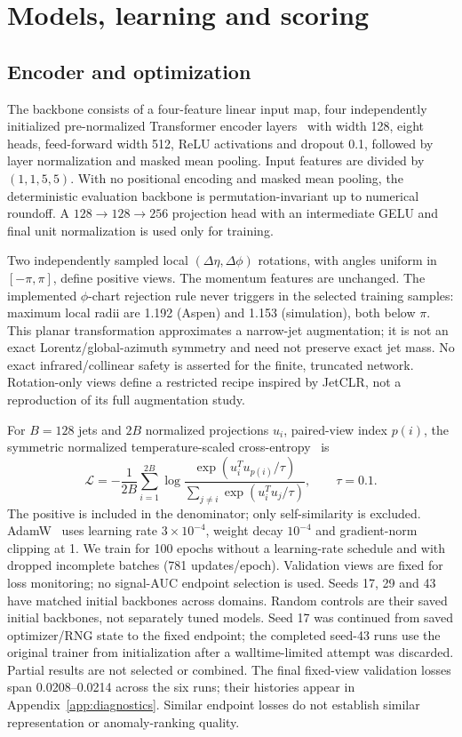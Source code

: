 \documentclass[11pt,a4paper]{article}
\begin{document}
\section{Models, learning and scoring}
\subsection{Encoder and optimization}
The backbone consists of a four-feature linear input map, four independently
initialized pre-normalized Transformer encoder layers~\cite{attention} with width
128, eight heads, feed-forward width 512, ReLU activations and dropout 0.1, followed
by layer normalization and masked mean pooling. Input features are divided by
$(1,1,5,5)$. With no positional encoding and masked mean pooling, the deterministic
evaluation backbone is permutation-invariant up to numerical roundoff.
A $128\to128\to256$ projection head
with an intermediate GELU and final unit normalization is used only for training.

Two independently sampled local $(\Delta\eta,\Delta\phi)$ rotations, with angles
uniform in $[-\pi,\pi]$, define positive views. The momentum features are unchanged.
The implemented $\phi$-chart rejection rule never triggers in the selected training
samples: maximum local radii are 1.192 (Aspen) and 1.153 (simulation), both below
$\pi$. This planar transformation approximates a narrow-jet augmentation; it is
not an exact Lorentz/global-azimuth symmetry and need not preserve exact jet mass.
No exact infrared/collinear safety is asserted for the finite, truncated network.
Rotation-only views define a restricted recipe inspired by JetCLR, not a
reproduction of its full augmentation study.

For $B=128$ jets and $2B$ normalized projections $u_i$, paired-view index $p(i)$,
the symmetric normalized temperature-scaled cross-entropy~\cite{simclr} is
\begin{equation}
 \mathcal L=-\frac{1}{2B}\sum_{i=1}^{2B}
 \log\frac{\exp(u_i^Tu_{p(i)}/\tau)}{\sum_{j\ne i}\exp(u_i^Tu_j/\tau)},\qquad\tau=0.1.
\end{equation}
The positive is included in the denominator; only self-similarity is excluded.
AdamW~\cite{adamw} uses learning rate $3\times10^{-4}$, weight decay $10^{-4}$ and
gradient-norm clipping at 1. We train for 100 epochs without a learning-rate
schedule and with dropped incomplete batches (781 updates/epoch). Validation
views are fixed for loss monitoring; no signal-AUC endpoint selection is used.
Seeds 17, 29 and 43 have matched initial backbones across domains. Random controls
are their saved initial backbones, not separately tuned models. Seed 17 was
continued from saved optimizer/RNG state to the fixed endpoint; the completed
seed-43 runs use the original trainer from initialization after a walltime-limited
attempt was discarded. Partial results are not selected or combined.
The final fixed-view validation losses span 0.0208--0.0214 across the six runs;
their histories appear in Appendix~\ref{app:diagnostics}. Similar endpoint losses
do not establish similar representation or anomaly-ranking quality.
\end{document}
